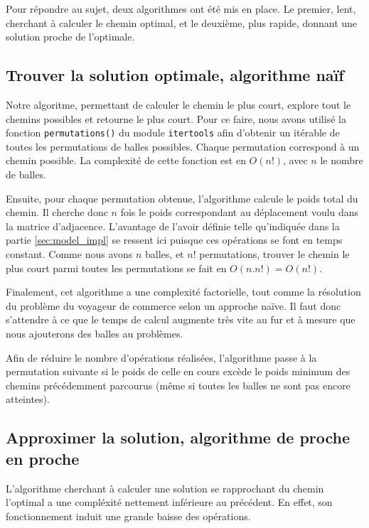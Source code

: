 \documentclass[12pt]{article}
\begin{document}
    Pour répondre au sujet, deux algorithmes ont été mis en place. Le premier, lent, cherchant à calculer le chemin optimal, et le deuxième, plus rapide, donnant une solution proche de l'optimale.

    \subsection{Trouver la solution optimale, algorithme naïf}
    \label{subsec:sol_opti}

    Notre algoritme, permettant de calculer le chemin le plus court, explore tout le chemins possibles et retourne le plus court. Pour ce faire, nous avons utilisé la fonction \verb|permutations()| du module \verb|itertools| afin d'obtenir un itérable de toutes les permutations de balles possibles. Chaque permutation correspond à un chemin possible. La complexité de cette fonction est en $O(n!)$, avec $n$ le nombre de balles.

    Ensuite, pour chaque permutation obtenue, l'algorithme calcule le poids total du chemin. Il cherche donc $n$ fois le poids correspondant au déplacement voulu dans la matrice d'adjacence. L'avantage de l'avoir définie telle qu'indiquée dans la partie \ref{sec:model_impl} se ressent ici puisque ces opérations se font en temps constant. Comme nous avons $n$ balles, et $n!$ permutations, trouver le chemin le plus court parmi toutes les permutations se fait en $O(n.n!) = O(n!)$.

    Finalement, cet algorithme a une complexité factorielle, tout comme la résolution du problème du voyageur de commerce selon un approche naïve. Il faut donc s'attendre à ce que le temps de calcul augmente très vite au fur et à mesure que nous ajouterons des balles au problèmes.

    Afin de réduire le nombre d'opérations réalisées, l'algorithme passe à la permutation suivante si le poids de celle en cours excède le poids minimum des chemins précédemment parcourus (même si toutes les balles ne sont pas encore atteintes).

    \subsection{Approximer la solution, algorithme de proche en proche}
    \label{subsec:sol_approch}

    L'algorithme cherchant à calculer une solution se rapprochant du chemin l'optimal a une compléxité nettement inférieure au précédent. En effet, son fonctionnement induit une grande baisse des opérations.
\end{document}
